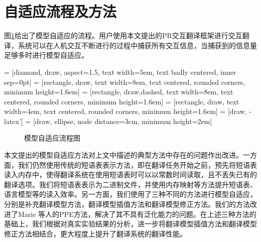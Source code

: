 \documentclass[master, winfont]{njuthesis}
\begin{document}
\section{自适应流程及方法}
\label{section:adapt}
图\ref{figure:adaptationFlow}给出了模型自适应的流程。用户使用本文提出的PR交互翻译框架进行交互翻译，系统可以在人机交互不断进行的过程中捕获所有交互信息，当捕获到的信息量足够多时进行模型自适应。


 = [diamond, draw, aspect=1.5,
    text width=5em, text badly centered, inner sep=0pt]
 = [rectangle, draw,
    text width=8em, text centered, rounded corners, minimum height=1.6em]
 = [rectangle, draw,dashed,
    text width=8em, text centered, rounded corners, minimum height=1.6em]
 = [rectangle, draw, text width=4em, text centered, rounded corners, minimum height=1.6em]
 = [draw, -latex']  = [draw, ellipse, node distance=3cm,
    minimum height=2em]
\begin {figure}[ht]
\centering
{}
\caption {\label{figure:adaptationFlow} 模型自适应流程图}
\end{figure}

本文提出的模型自适应方法对上文中描述的典型方法中存在的问题作出改进。一方面，我们仍然使用传统的短语表表示方法，即在翻译任务开始之前，预先将短语表读入内存中，使得翻译系统在使用短语表时可以以常数时间读取，且不丢失已有的翻译选项。我们将短语表表示为二进制文件，并使用内存映射等方法提升短语表、语言模型等的读入效率。另一方面，我们使用了三种不同的方法进行模型自适应，分别是补充翻译模型方法，翻译模型插值方法和翻译模型修正方法。我们的方法改进了Marie 等人的PPE方法，解决了其不具有泛化能力的问题。在上述三种方法的基础上，我们根据对真实实验结果的分析，进一步将翻译模型插值方法和翻译模型修正方法相结合，更大程度上提升了翻译系统的翻译性能。
\end{document}
